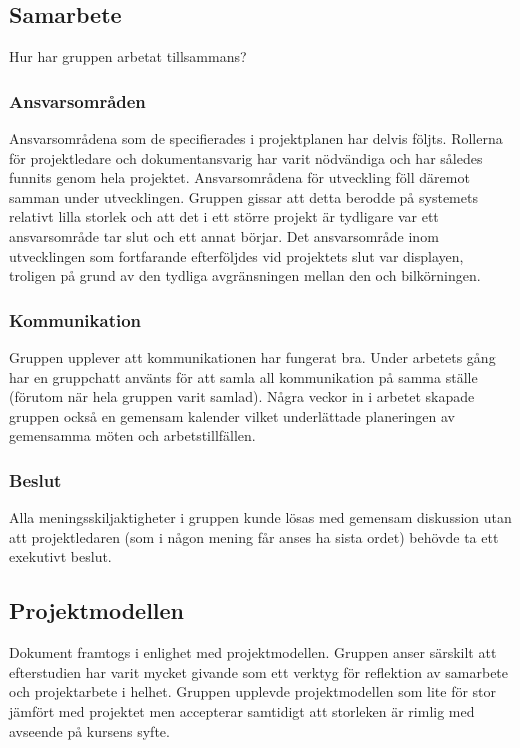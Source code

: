 \documentclass[10pt,oneside,swedish]{lips}
\begin{document}
\subsection{Samarbete}

Hur har gruppen arbetat tillsammans?

\subsubsection{Ansvarsområden}

Ansvarsområdena som de specifierades i projektplanen har delvis följts.
Rollerna för projektledare och dokumentansvarig har varit nödvändiga och har
således funnits genom hela projektet. Ansvarsområdena för utveckling föll
däremot samman under utvecklingen. Gruppen gissar att detta berodde på systemets
relativt lilla storlek och att det i ett större projekt är tydligare var ett
ansvarsområde tar slut och ett annat börjar. Det ansvarsområde inom utvecklingen
som fortfarande efterföljdes vid projektets slut var displayen, troligen på
grund av den tydliga avgränsningen mellan den och bilkörningen.

\subsubsection{Kommunikation}

Gruppen upplever att kommunikationen har fungerat bra. Under arbetets gång har
en gruppchatt använts för att samla all kommunikation på samma ställe (förutom
när hela gruppen varit samlad). Några veckor in i arbetet skapade gruppen också
en gemensam kalender vilket underlättade planeringen av gemensamma möten och
arbetstillfällen.

\subsubsection{Beslut}

Alla meningsskiljaktigheter i gruppen kunde lösas med gemensam diskussion utan
att projektledaren (som i någon mening får anses ha sista ordet) behövde ta ett
exekutivt beslut.

\subsection{Projektmodellen}

Dokument framtogs i enlighet med projektmodellen. Gruppen anser särskilt att
efterstudien har varit mycket givande som ett verktyg för reflektion av
samarbete och projektarbete i helhet. Gruppen upplevde projektmodellen som lite
för stor jämfört med projektet men accepterar samtidigt att storleken är rimlig
med avseende på kursens syfte.
\end{document}
